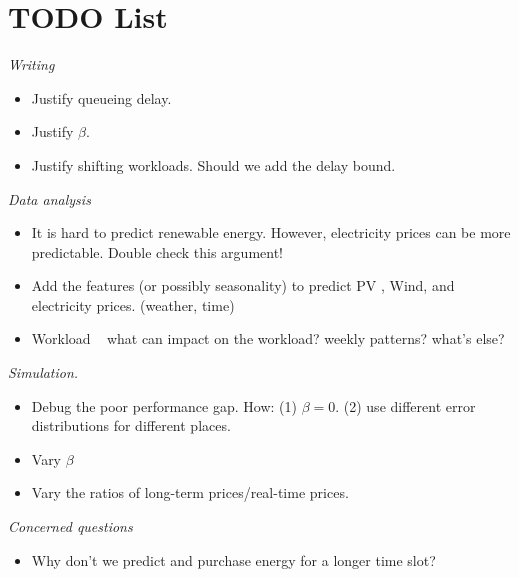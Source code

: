 \section*{TODO List}

\emph{Writing}

\begin{itemize}
	\item Justify queueing delay.
	\item Justify $\beta$.
	\item Justify shifting workloads. Should we add the delay bound.
\end{itemize}

\emph{Data analysis}

\begin{itemize}
	\item It is hard to predict renewable energy. However, electricity prices can be more predictable. Double check this argument!
	\item Add the features (or possibly seasonality) to predict PV , Wind, and electricity prices. (weather, time)
	\item Workload ~ what can impact on the workload? weekly patterns? what's else?
\end{itemize}

\emph{Simulation.}

\begin{itemize}
	\item Debug the poor performance gap. How: (1) $\beta=0$. (2) use different error distributions for different places.
	\item Vary $\beta$
	\item Vary the ratios of long-term prices/real-time prices.
\end{itemize}

\emph{Concerned questions}
\begin{itemize}
	\item Why don't we predict and purchase energy for a longer time slot?
\end{itemize}